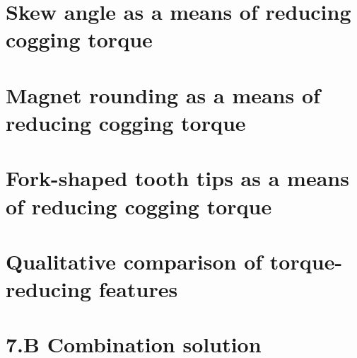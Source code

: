 \newpage

\section{Skew angle as a means of reducing cogging torque}

\section{Magnet rounding as a means of reducing cogging torque}

\section{Fork-shaped tooth tips as a means of reducing cogging torque}

\section{Qualitative comparison of torque-reducing features}

\section*{7.B Combination solution}

\newpage